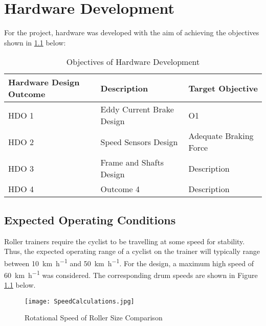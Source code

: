 
\chapter{Hardware Development}

For the project, hardware was developed with the aim of achieving the objectives shown in \ref{tab:devgoals} below:

\begin{table}[h!]
	\renewcommand{\arraystretch}{1.2}
	\centering
	\caption{Objectives of Hardware Development}
	\begin{tabularx}{\textwidth}{p{3.2cm} >{\raggedright}p{5cm} >{\raggedright\arraybackslash}X}
		\toprule
		Hardware Design Outcome & Description               & Target Objective       \\
		\midrule
		HDO 1                   & Eddy Current Brake Design & O1                     \\
		HDO 2                   & Speed Sensors Design      & Adequate Braking Force \\
		HDO 3                   & Frame and Shafts Design   & Description            \\
		HDO 4                   & Outcome 4                 & Description            \\
		\bottomrule
	\end{tabularx}
	\label{tab:devgoals}
\end{table}

\newpage

\section{Expected Operating Conditions}

Roller trainers require the cyclist to be travelling at some speed for stability. Thus, the expected operating range of a cyclist on the trainer will typically range between \SI{10}{\kilo\meter\per\hour} and \SI{50}{\kilo\meter\per\hour}. For the design, a maximum high speed of \SI{60}{\kilo\meter\per\hour} was considered. The corresponding drum speeds are shown in Figure \ref{fig:speedCalc} below.

\begin{figure}[H]
	\begin{center}
		\texttt{[image: SpeedCalculations.jpg]}
		\caption{Rotational Speed of Roller Size Comparison}
		\label{fig:speedCalc}
	\end{center}
\end{figure}

